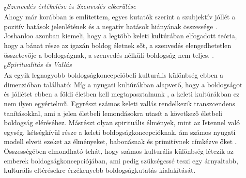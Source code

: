 \textsubscript{5}\textit{Szenvedés értékelése} és \textit{Szenvedés elkerülése}\\
Ahogy már korábban is említettem, egyes kutatók szerint a szubjektív jóllét a pozitív hatások jelenlétének és a negatív hatások hiányának összessége \cite{diener_suh_lucas_smith_1999}. Joshanloo azonban kiemeli, hogy a legtöbb keleti kultúrában elfogadott teória, hogy a bánat része az igazán boldog életnek sőt, a szenvedés elengedhetetlen összetevője a boldogságnak, a szenvedés nélküli boldogság nem teljes. \cite{joshanloo_2013_eastern}.\\
\textsubscript{6}\textit{Spiritualitás és Vallás}\\
Az egyik legnagyobb boldogságkoncepcióbeli kulturális különbség ebben a dimenzi\-óban található: Míg a nyugati kultúrákban alapvető, hogy a boldogságot és jóllétet ebben a földi életben kell megtapasztalnunk \cite{joshanloo_2013_eastern}, a keleti kultúrákban ez nem ilyen egyértelmű. Egyrészt számos keleti vallás rendelkezik transzcendens tanításokkal, ami a jelen életbeli lemondásokra utasít a következő életbeli boldogság eléréséhez. Másrészt olyan spirituális élmények, mint az Istennel való egység, kétség\-kívül része a keleti boldogságkoncepcióknak, ám számos nyugati modell elveti ezeket az élményeket, babonásnak és primitívnek címkézve őket \cite{joshanloo_2013_eastern}.\\
Összességében elmondható tehát, hogy számos kulturális különbség létezik az emberek boldogságkoncepciójában, ami pedig szükségessé teszi egy árnyaltabb, kulturális eltérésekre érzékenyebb boldogságkutatás kialakítását.

